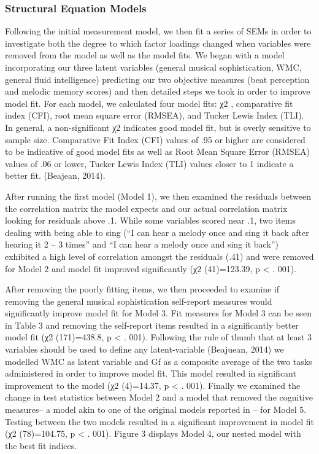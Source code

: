 \documentclass[]{book}
\begin{document}
\hypertarget{structural-equation-models}{%
\subsubsection{Structural Equation Models}\label{structural-equation-models}}

Following the initial measurement model, we then fit a series of SEMs in order to investigate both the degree to which factor loadings changed when variables were removed from the model as well as the model fits.
We began with a model incorporating our three latent variables (general musical sophistication, WMC, general fluid intelligence) predicting our two objective measures (beat perception and melodic memory scores) and then detailed steps we took in order to improve model fit.
For each model, we calculated four model fits: χ2 , comparative fit index (CFI), root mean square error (RMSEA), and Tucker Lewis Index (TLI).
In general, a non-significant χ2 indicates good model fit, but is overly sensitive to sample size.
Comparative Fit Index (CFI) values of .95 or higher are considered to be indicative of good model fits as well as Root Mean Square Error (RMSEA) values of .06 or lower, Tucker Lewis Index (TLI) values closer to 1 indicate a better fit. (Beajean, 2014).

After running the first model (Model 1), we then examined the residuals between the correlation matrix the model expects and our actual correlation matrix looking for residuals
above .1.
While some variables scored near .1, two items dealing with being able to sing (``I can hear a melody once and sing it back after hearing it 2 -- 3 times'' and ``I can hear a melody once and sing it back'') exhibited a high level of correlation amongst the residuals (.41) and were removed for Model 2 and model fit improved significantly (χ2 (41)=123.39,
p \textless{} . 001).

After removing the poorly fitting items, we then proceeded to examine if removing the general musical sophistication self-report measures would significantly improve model fit for Model 3.
Fit measures for Model 3 can be seen in Table 3 and removing the self-report items resulted in a significantly better model fit (χ2 (171)=438.8, p \textless{} . 001).
Following the rule of thumb that at least 3 variables should be used to define any latent-variable (Beajuean, 2014) we modelled WMC as latent variable and Gf as a composite average of the two tasks administered in order to improve model fit.
This model resulted in significant improvement to the model (χ2 (4)=14.37, p \textless{} . 001).
Finally we examined the change in test statistics between Model 2 and a model that removed the cognitive measures-- a model akin to one of the original models reported in \citep{mullensiefenMusicalityNonMusiciansIndex2014}-- for Model 5.
Testing between the two models resulted in a significant improvement in model fit (χ2 (78)=104.75, p \textless{} . 001).
Figure 3 displays Model 4, our nested model with the best fit indices.
\end{document}
